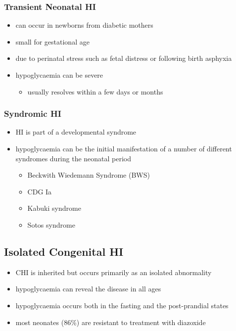 \documentclass{scrartcl}
\begin{document}
\subsubsection{Transient Neonatal HI}
\label{sec:orge0b8ad6}
\begin{itemize}
\item can occur in newborns from diabetic mothers
\item small for gestational age
\item due to perinatal stress such as fetal distress or following birth asphyxia
\item hypoglycaemia can be severe
\begin{itemize}
\item usually resolves within a few days or months
\end{itemize}
\end{itemize}
\subsubsection{Syndromic HI}
\label{sec:org84fbede}
\begin{itemize}
\item HI is part of a developmental syndrome
\item hypoglycaemia can be the initial manifestation of a number of
different syndromes during the neonatal period
\begin{itemize}
\item Beckwith Wiedemann Syndrome (BWS)
\item CDG Ia
\item Kabuki syndrome
\item Sotos syndrome
\end{itemize}
\end{itemize}

\subsection{Isolated Congenital HI}
\label{sec:orgd6477b1}
\begin{itemize}
\item CHI is inherited but occurs primarily as an isolated abnormality
\item hypoglycaemia can reveal the disease in all ages
\item hypoglycaemia occurs both in the fasting and the post-prandial states
\item most neonates (86\%) are resistant to treatment with diazoxide
\end{itemize}
\end{document}
